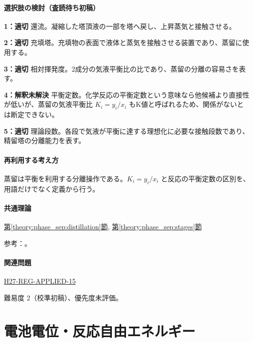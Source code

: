 \paragraph{選択肢の検討（査読待ち初稿）}\mbox{}\par

\noindent\textbf{1：適切} 還流。凝縮した塔頂液の一部を塔へ戻し、上昇蒸気と接触させる。\par

\noindent\textbf{2：適切} 充填塔。充填物の表面で液体と蒸気を接触させる装置であり、蒸留に使用する。\par

\noindent\textbf{3：適切} 相対揮発度。2成分の気液平衡比の比であり、蒸留の分離の容易さを表す。\par

\noindent\textbf{4：解釈未解決} 平衡定数。化学反応の平衡定数という意味なら他候補より直接性が低いが、蒸留の気液平衡比 \(K_i=y_i/x_i\) もK値と呼ばれるため、関係がないとは断定できない。\par

\noindent\textbf{5：適切} 理論段数。各段で気液が平衡に達する理想化に必要な接触段数であり、精留塔の分離能力を表す。\par

\paragraph{再利用する考え方} 蒸留は平衡を利用する分離操作である。\(K_i=y_i/x_i\) と反応の平衡定数の区別を、用語だけでなく定義から行う。

\paragraph{共通理論} \hyperref[theory:phase_sep:distillation]{第\ref*{theory:phase_sep:distillation}節}, \hyperref[theory:phase_sep:stages]{第\ref*{theory:phase_sep:stages}節}

\par 参考：\cite{nptel_distillation1}。

\paragraph{関連問題} \hyperref[q:h27-reg-applied-15]{H27-REG-APPLIED-15}

\par 難易度 2（校準初稿）、優先度未評価。

\section{電池電位・反応自由エネルギー}

